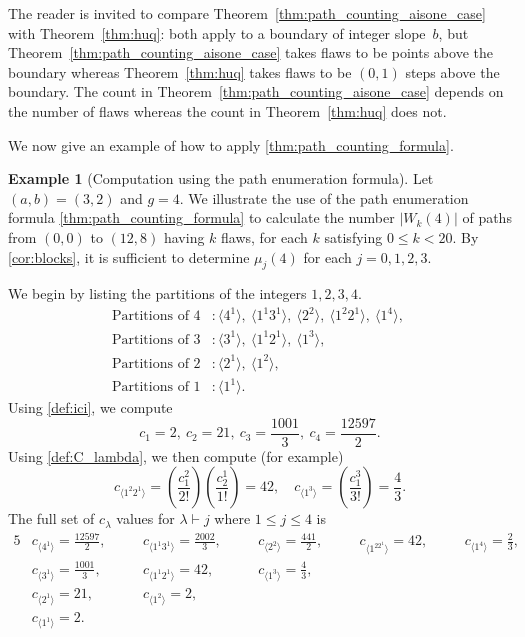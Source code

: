 \documentclass[11pt]{article}
\theoremstyle{definition} %
\newtheorem{example}[thm]{Example}
\numberwithin{equation}{section}
\begin{document}
The reader is invited to compare 
Theorem~\ref{thm:path_counting_aisone_case} with Theorem~\ref{thm:huq}: 
both apply to a boundary of integer slope~$b$, but 
Theorem~\ref{thm:path_counting_aisone_case}
takes flaws to be points above the boundary whereas 
Theorem~\ref{thm:huq}
takes flaws to be $(0,1)$ steps above the boundary.
The count in Theorem~\ref{thm:path_counting_aisone_case} depends on the number of flaws whereas the count in Theorem~\ref{thm:huq} does not.

We now give an example of how to apply \cref{thm:path_counting_formula}.

\begin{example}[Computation using the path enumeration formula]
Let $(a,b) = (3,2)$ and $g=4$. We illustrate the use of the path enumeration formula  \cref{thm:path_counting_formula} to calculate the number $|W_k(4)|$ of paths from $(0,0)$ to $(12,8)$ having $k$ flaws, for each $k$ satisfying $0 \le k < 20$.
By \cref{cor:blocks}, it is sufficient to determine $\mu_j(4)$ for each $j = 0,1,2,3$.

    We begin by listing the  partitions of the integers $1,2,3,4$.
    \begin{align}
        \mbox{Partitions of }4 &: \langle 4^1 \rangle, \ \langle 1^1 3^1\rangle, \ \langle 2^2 \rangle, \ \langle 1^2 2^1 \rangle, \ \langle 1^4 \rangle, \ \\
        \mbox{Partitions of }3 &: \langle 3^1 \rangle, \ \langle 1^1 2^1\rangle, \ \langle 1^3 \rangle, \ \\
        \mbox{Partitions of }2 &:\langle 2^1 \rangle, \ \langle 1^2 \rangle, \ \\
        \mbox{Partitions of }1 &:\langle1^1 \rangle.
    \end{align} 
    Using \eqref{def:ici}, we compute  
    $$
    c_1 = 2, \ c_2 = 21,\ c_3 = \frac{1001}{3}, \ c_4 = \frac{12597}2.
    $$
    Using \eqref{def:C_lambda}, we then compute (for example)
    $$
    c_{\langle 1^2 2^1\rangle} = \left( \frac{c_1^2}{2!}\right) \left( \frac{c_2^1}{1!}\right) = 42, \quad
    c_{\langle 1^3\rangle} = \left( \frac{c_1^3}{3!}\right) = \frac{4}{3}.
    $$
    The full set of $c_\lambda$ values for $\lambda \vdash j$ where $1 \leq j \leq 4$ is
    \begin{alignat}{5}
        & c_{\langle 4^1 \rangle}=\frac{12597}2, \quad && c_{\langle 1^1 3^1\rangle}=\frac{2002}{3}, \quad && c_{\langle 2^2 \rangle}=\frac{441}{2}, \quad && c_{\langle 1^22^1 \rangle}=42, \quad && c_{\langle 1^4\rangle}= \frac23,\\
        & c_{\langle 3^1 \rangle}=\frac{1001}{3}, \quad && c_{\langle 1^1 2^1\rangle}=42, \quad && c_{\langle 1^3 \rangle}=\frac43, \quad && &&\\
        & c_{\langle 2^1 \rangle}= 21, \quad && c_{\langle 1^2 \rangle}=2, \quad && && &&\\
        & c_{\langle1^1 \rangle}=2. \quad  && && && &&
    \end{alignat} 


\end{example}
\end{document}
